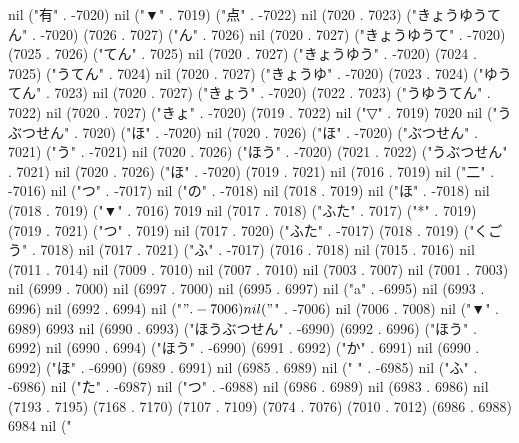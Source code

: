 nil ("有" . -7020) nil ("▼" . 7019) ("点" . -7022) nil (7020 . 7023) ("きょうゆうてん" . -7020) (7026 . 7027) ("ん" . 7026) nil (7020 . 7027) ("きょうゆうて" . -7020) (7025 . 7026) ("てん" . 7025) nil (7020 . 7027) ("きょうゆう" . -7020) (7024 . 7025) ("うてん" . 7024) nil (7020 . 7027) ("きょうゆ" . -7020) (7023 . 7024) ("ゆうてん" . 7023) nil (7020 . 7027) ("きょう" . -7020) (7022 . 7023) ("うゆうてん" . 7022) nil (7020 . 7027) ("きょ" . -7020) (7019 . 7022) nil ("▽" . 7019) 7020 nil ("うぶつせん" . 7020) ("ほ" . -7020) nil (7020 . 7026) ("ほ" . -7020) ("ぶつせん" . 7021) ("う" . -7021) nil (7020 . 7026) ("ほう" . -7020) (7021 . 7022) ("うぶつせん" . 7021) nil (7020 . 7026) ("ほ" . -7020) (7019 . 7021) nil (7016 . 7019) nil ("二" . -7016) nil ("つ" . -7017) nil ("の" . -7018) nil (7018 . 7019) nil ("ほ" . -7018) nil (7018 . 7019) ("▼" . 7016) 7019 nil (7017 . 7018) ("ふた" . 7017) ("*" . 7019) (7019 . 7021) ("つ" . 7019) nil (7017 . 7020) ("ふた" . -7017) (7018 . 7019) ("くごう" . 7018) nil (7017 . 7021) ("ふ" . -7017) (7016 . 7018) nil (7015 . 7016) nil (7011 . 7014) nil (7009 . 7010) nil (7007 . 7010) nil (7003 . 7007) nil (7001 . 7003) nil (6999 . 7000) nil (6997 . 7000) nil (6995 . 6997) nil ("a" . -6995) nil (6993 . 6996) nil (6992 . 6994) nil ("$" . -7006) nil ("$" . -7006) nil (7006 . 7008) nil ("▼" . 6989) 6993 nil (6990 . 6993) ("ほうぶつせん" . -6990) (6992 . 6996) ("ほう" . 6992) nil (6990 . 6994) ("ほう" . -6990) (6991 . 6992) ("か" . 6991) nil (6990 . 6992) ("ほ" . -6990) (6989 . 6991) nil (6985 . 6989) nil (" " . -6985) nil ("ふ" . -6986) nil ("た" . -6987) nil ("つ" . -6988) nil (6986 . 6989) nil (6983 . 6986) nil (7193 . 7195) (7168 . 7170) (7107 . 7109) (7074 . 7076) (7010 . 7012) (6986 . 6988) 6984 nil ("%
